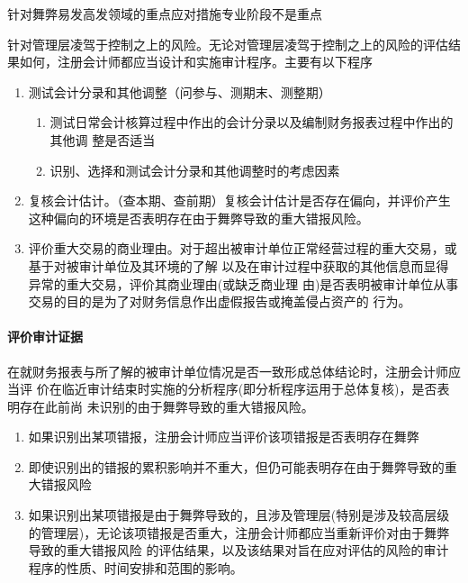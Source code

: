 \documentclass[UTF8,12pt]{ctexart}
\numberwithin{equation}{section} %
\numberwithin{figure}{section}
\numberwithin{table}{section}
\begin{document}
	针对舞弊易发高发领域的重点应对措施专业阶段不是重点
	
	针对管理层凌驾于控制之上的风险。无论对管理层凌驾于控制之上的风险的评估结果如何，注册会计师都应当设计和实施审计程序。主要有以下程序
	\begin{enumerate}
		\item 测试会计分录和其他调整（问参与、测期末、测整期）
		\begin{enumerate}
			\item 测试日常会计核算过程中作出的会计分录以及编制财务报表过程中作出的其他调 整是否适当
			
			\item 识别、选择和测试会计分录和其他调整时的考虑因素
		\end{enumerate}
		
		\item 复核会计估计。（查本期、查前期）复核会计估计是否存在偏向，并评价产生这种偏向的环境是否表明存在由于舞弊导致的重大错报风险。
		
		\item 评价重大交易的商业理由。对于超出被审计单位正常经营过程的重大交易，或基于对被审计单位及其环境的了解
		以及在审计过程中获取的其他信息而显得异常的重大交易，评价其商业理由(或缺乏商业理 由)是否表明被审计单位从事交易的目的是为了对财务信息作出虚假报告或掩盖侵占资产的 行为。
	\end{enumerate}
	
	\paragraph{评价审计证据}
	在就财务报表与所了解的被审计单位情况是否一致形成总体结论时，注册会计师应当评 价在临近审计结束时实施的分析程序(即分析程序运用于总体复核)，是否表明存在此前尚 未识别的由于舞弊导致的重大错报风险。
	
	\begin{enumerate}
		\item 如果识别出某项错报，注册会计师应当评价该项错报是否表明存在舞弊
		
		\item 即使识别出的错报的累积影响并不重大，但仍可能表明存在由于舞弊导致的重大错报风险
		
		\item 如果识别出某项错报是由于舞弊导致的，且涉及管理层(特别是涉及较高层级的管理层)，无论该项错报是否重大，注册会计师都应当重新评价对由于舞弊导致的重大错报风险 的评估结果，以及该结果对旨在应对评估的风险的审计程序的性质、时间安排和范围的影响。
	\end{enumerate}
	
\end{document}
